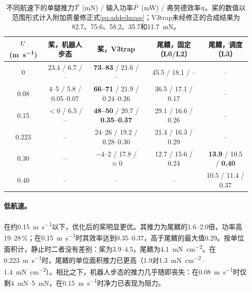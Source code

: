 \begin{table}[t]
  \centering
  \caption[不同航速下的推进器对比]{不同航速下的单腿推力$\bar{T}$ (mN) / 输入功率$\bar{P}$ (mW) / 弗劳德效率$\eta$。桨的数值以范围形式计入附加质量修正式\eqref{eq:addedmass}；V3trap未经修正的合成结果为82.7、75.6、58.2、35.7和\SI{11.7}{\milli\newton}。}
  \label{tab:compare}
  \footnotesize
  \begin{tabular}{@{}ccccc@{}}
    \toprule
    $U$ (\si{\metre\per\second}) & 桨，机器人步态 & 桨，V3trap & 尾鳍，固定（L0/L2） & 尾鳍，调度（L3） \\
    \midrule
    0     & 23.4 / 6.7 / --         & \textbf{73--83} / 21.6 / --                & 45.5 / 18.1 / --      & -- \\
    0.08  & 4--5 / 5.8 / 0.05--0.07 & \textbf{66--71} / 21.9 / 0.24--0.26        & 36.5 / 17.1 / 0.17    & -- \\
    0.15  & $<0$ / 6.5 / --         & \textbf{48--50} / 20.7 / \textbf{0.35--0.37} & 29.1 / 16.6 / 0.26  & -- \\
    0.223 & --                      & 24--26 / 19.2 / 0.28--0.30               & 21.4 / 16.3 / 0.29    & -- \\
    0.30  & --                      & $-4$--2 / 17.8 / $\approx0$                & 12.7 / 15.6 / 0.24    & \textbf{13.9} / 10.5 / \textbf{0.40} \\
    0.40  & --                      & --                                       & --                    & 10.5 / 11.4 / 0.37 \\
    \bottomrule
  \end{tabular}
\end{table}

\paragraph{低航速。}在约\SI{0.15}{\metre\per\second}以下，优化后的桨明显更优。其推力为尾鳍的1.6--2.0倍，功率高19--28\,\%；在\SI{0.15}{\metre\per\second}时其效率达到0.35--0.37，高于尾鳍的最大值0.29。按单位面积计，静止时二者没有差别：桨为\SIrange{3.9}{4.5}{}，尾鳍为\SI{4.1}{\milli\newton\per\square\centi\metre}。在\SI{0.223}{\metre\per\second}时，尾鳍的单位面积推力已更高（\SI{1.9}{}对\SIrange{1.3}{1.4}{\milli\newton\per\square\centi\metre}）。相比之下，机器人步态的推力几乎随即丧失：在\SI{0.08}{\metre\per\second}时仅剩\SIrange{4}{5}{\milli\newton}，在\SI{0.15}{\metre\per\second}时净力已表现为阻力。

